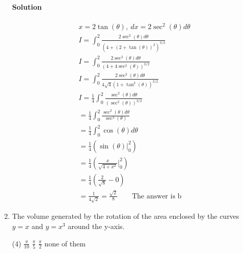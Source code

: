 \documentclass[MATH-115-Notes.tex]{subfiles}
\begin{document}
\begin{enumerate}[itemsep=5mm]
        \paragraph*{Solution}
        \begin{gather*}
            x = 2\tan(\theta),\ dx = 2\sec^2(\theta)d\theta\\
            I  = \int_{0}^{2}\frac{2\sec^2(\theta)d\theta}{(4 + (2+\tan(\theta))^2)^{3/2}}\\
            I  = \int_{0}^{2}\frac{2\sec^2(\theta)d\theta}{(4 + 4 \sec^2(\theta))^{3/2}}\\
            I  = \int_{0}^{2}\frac{2\sec^2(\theta)d\theta}{4\sqrt{4}(1+\tan^2(\theta))^{3/2}}\\
            I = \frac{1}{4}\int_{0}^{2}\frac{\sec^2(\theta)d\theta}{(\sec^2(\theta))^{3/2}}\\
            = \frac{1}{4} \int_{0}^{2}\frac{\sec^2(\theta)d\theta}{\sec^3(\theta)}\\
            = \frac{1}{4} \int_{0}^{2} \cos(\theta)d\theta\\
            = \frac{1}{4} \left( \sin(\theta) \Big|_0^2 \right)\\
            = \frac{1}{4} \left( \frac{x}{\sqrt{4 + x^2}} \Big|_0^2 \right)\\
            = \frac{1}{4}\left( \frac{2}{\sqrt{8}} - 0 \right)\\
            = \frac{1}{4\sqrt{2}} = \frac{\sqrt{2}}{8}\qquad \text{The answer is b}
        \end{gather*}
        \item The volume generated by the rotation of the area enclosed by the curves $y = x$ and $ y = x^3$ around the y-axis.
        \begin{tasks}(4)
            \task\(\frac{\pi}{10}\)
            \task \(\frac{\pi}{5}\)
            \task \(\frac{\pi}{2}\)
            \task none of them
        \end{tasks}

\end{enumerate}
\end{document}
